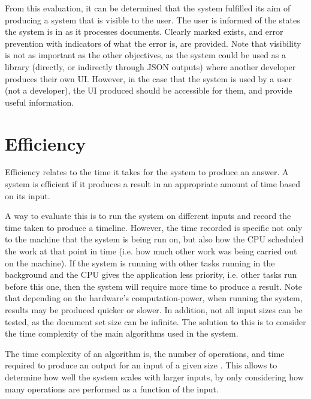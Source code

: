 \par From this evaluation, it can be determined that the system fulfilled its aim of producing a system that is visible to the user. The user is informed of the states the system is in as it processes documents. Clearly marked exists, and error prevention with indicators of what the error is, are provided. Note that visibility is not as important as the other objectives, as the system could be used as a library (directly, or indirectly through JSON outputs) where another developer produces their own UI. However, in the case that the system is used by a user (not a developer), the UI produced should be accessible for them, and provide useful information.

\section{Efficiency}
\par Efficiency relates to the time it takes for the system to produce an answer. A system is efficient if it produces a result in an appropriate amount of time based on its input.

\par A way to evaluate this is to run the system on different inputs and record the time taken to produce a timeline. However, the time recorded is specific not only to the machine that the system is being run on, but also how the CPU scheduled the work at that point in time (i.e. how much other work was being carried out on the machine). If the system is running with other tasks running in the background and the CPU gives the application less priority, i.e. other tasks run before this one, then the system will require more time to produce a result. Note that depending on the hardware's computation-power, when running the system, results may be produced quicker or slower. In addition, not all input sizes can be tested, as the document set size can be infinite. The solution to this is to consider the time complexity of the main algorithms used in the system. 

\par The time complexity of an algorithm is, the number of operations, and time required to produce an output for an input of a given size \cite{sipser2012}. This allows to determine how well the system scales with larger inputs, by only considering how many operations are performed as a function of the input.

